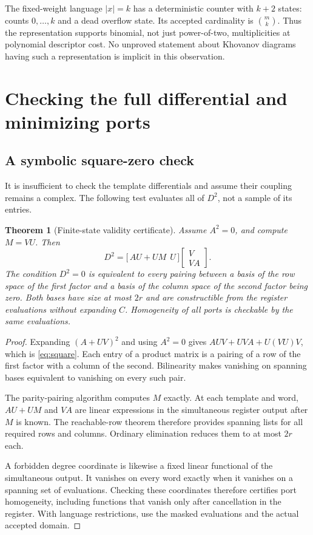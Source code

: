 \documentclass[11pt,letterpaper]{article}
\newtheorem{theorem}{Theorem}[section]
\theoremstyle{definition}
\theoremstyle{remark}
\numberwithin{equation}{section}
\begin{document}
The fixed-weight language $|x|=k$ has a deterministic counter with
$k+2$ states: counts $0,\ldots,k$ and a dead overflow state. Its accepted
cardinality is $\binom mk$. Thus the representation supports binomial,
not just power-of-two, multiplicities at polynomial descriptor cost.
No unproved statement about Khovanov diagrams having such a representation
is implicit in this observation.

\section{Checking the full differential and minimizing ports}
\label{sec:validity}

\subsection{A symbolic square-zero check}
It is insufficient to check the template differentials and assume their
coupling remains a complex. The following test evaluates all of $D^2$,
not a sample of its entries.

\begin{theorem}[Finite-state validity certificate]
\label{thm:square}
Assume $A^2=0$, and compute $M=VU$. Then
\begin{equation}
 D^2=\bigl[\,AU+UM\ \ U\,\bigr]
       \begin{bmatrix}V\\VA\end{bmatrix}.
 \label{eq:square}
\end{equation}
The condition $D^2=0$ is equivalent to every pairing between a basis of
the row space of the first factor and a basis of the column space of the
second factor being zero. Both bases have size at most $2r$ and are
constructible from the register evaluations without expanding $C$.
Homogeneity of all ports is checkable by the same evaluations.
\end{theorem}
\begin{proof}
Expanding $(A+UV)^2$ and using $A^2=0$ gives
$AUV+UVA+U(VU)V$, which is \eqref{eq:square}. Each entry of a product
matrix is a pairing of a row of the first factor with a column of the
second. Bilinearity makes vanishing on spanning bases equivalent to
vanishing on every such pair.

The parity-pairing algorithm computes $M$ exactly. At each template and
word, $AU+UM$ and $VA$ are linear expressions in the simultaneous
register output after $M$ is known. The reachable-row theorem therefore
provides spanning lists for all required rows and columns. Ordinary
elimination reduces them to at most $2r$ each.

A forbidden degree coordinate is likewise a fixed linear functional of
the simultaneous output. It vanishes on every word exactly when it
vanishes on a spanning set of evaluations. Checking these coordinates
therefore certifies port homogeneity, including functions that vanish
only after cancellation in the register. With language restrictions,
use the masked evaluations and the actual accepted domain.
\end{proof}
\end{document}
